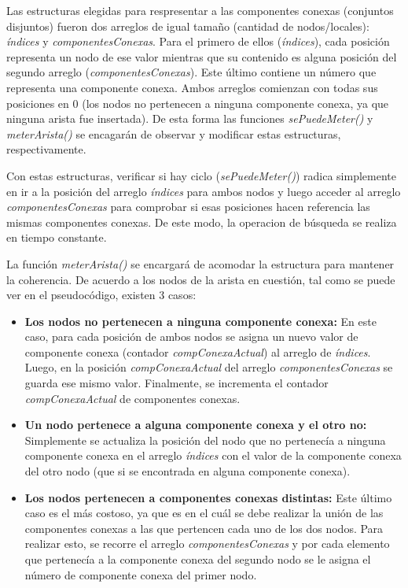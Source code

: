 \documentclass[a4paper,11pt] {article}
\begin{document}
Las estructuras elegidas para respresentar a las componentes conexas (conjuntos disjuntos) fueron dos arreglos de igual tamaño (cantidad de nodos/locales): \textit{índices} y \textit{componentesConexas}. Para el primero de ellos (\textit{índices}), cada posición representa un nodo de ese valor mientras que su contenido es alguna posición del segundo arreglo (\textit{componentesConexas}). Este último contiene un número que representa una componente conexa. Ambos arreglos comienzan con todas sus posiciones en $0$ (los nodos no pertenecen a ninguna componente conexa, ya que ninguna arista fue insertada). De esta forma las funciones \textit{sePuedeMeter()} y \textit{meterArista()} se encagarán de observar y modificar estas estructuras, respectivamente.

Con estas estructuras, verificar si hay ciclo (\textit{sePuedeMeter()}) radica simplemente en ir a la posición del arreglo \textit{índices} para ambos nodos y luego acceder al arreglo \textit{componentesConexas} para comprobar si esas posiciones hacen referencia las mismas componentes conexas. De este modo, la operacion de búsqueda se realiza en tiempo constante.

La función \textit{meterArista()} se encargará de acomodar la estructura para mantener la coherencia. De acuerdo a los nodos de la arista en cuestión, tal como se puede ver en el pseudocódigo, existen 3 casos:
\begin{itemize}
 \item \textbf{Los nodos no pertenecen a ninguna componente conexa:} En este caso, para cada posición de ambos nodos se asigna un nuevo valor de componente conexa (contador \textit{compConexaActual}) al arreglo de \textit{índices}. Luego, en la posición \textit{compConexaActual} del arreglo \textit{componentesConexas} se guarda ese mismo valor. Finalmente, se incrementa el contador \textit{compConexaActual} de componentes conexas.

 \item \textbf{Un nodo pertenece a alguna componente conexa y el otro no:} Simplemente se actualiza la posición del nodo que no pertenecía a ninguna componente conexa en el arreglo \textit{índices} con el valor de la componente conexa del otro nodo (que si se encontrada en alguna componente conexa).

 \item \textbf{Los nodos pertenecen a componentes conexas distintas:} Este último caso es el más costoso, ya que es en el cuál se debe realizar la unión de las componentes conexas a las que pertencen cada uno de los dos nodos. Para realizar esto, se recorre el arreglo \textit{componentesConexas} y por cada elemento que pertenecía a la componente conexa del segundo nodo se le asigna el número de componente conexa del primer nodo.
\end{itemize}
\end{document}

